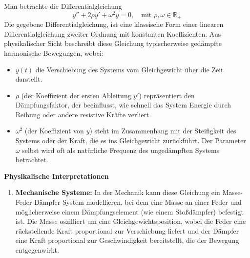 {\label{aufgabe:oszillator}
Man betrachte die Differentialgleichung
\[
y'' + 2\rho y' + \omega^2 y = 0, \quad \text{mit } \rho, \omega \in \mathbb R_+
\]
Die gegebene Differentialgleichung, ist eine klassische Form einer linearen Differentialgleichung zweiter Ordnung mit konstanten Koeffizienten. Aus physikalischer Sicht beschreibt diese Gleichung typischerweise gedämpfte harmonische Bewegungen, wobei:
\begin{itemize}
  \item \( y(t) \) die Verschiebung des Systems vom Gleichgewicht über die Zeit darstellt.
  \item \( \rho \) (der Koeffizient der ersten Ableitung \( y' \)) repräsentiert den Dämpfungsfaktor, der beeinflusst, wie schnell das System Energie durch Reibung oder andere resistive Kräfte verliert.
  \item \( \omega^2 \) (der Koeffizient von \( y \)) steht im Zusammenhang mit der Steifigkeit des Systems oder der Kraft, die es ins Gleichgewicht zurückführt. Der Parameter \( \omega \) selbst wird oft als natürliche Frequenz des ungedämpften Systems betrachtet.
\end{itemize}

\textbf{Physikalische Interpretationen}
\begin{enumerate}
  \item \textbf{Mechanische Systeme:} In der Mechanik kann diese Gleichung ein Masse-Feder-Dämpfer-System modellieren, bei dem eine Masse an einer Feder und möglicherweise einem Dämpfungselement (wie einem Stoßdämpfer) befestigt ist. Die Masse oszilliert um eine Gleichgewichtsposition, wobei die Feder eine rückstellende Kraft proportional zur Verschiebung liefert und der Dämpfer eine Kraft proportional zur Geschwindigkeit bereitstellt, die der Bewegung entgegenwirkt.

\begin{center}
\end{center}
\end{enumerate}}
